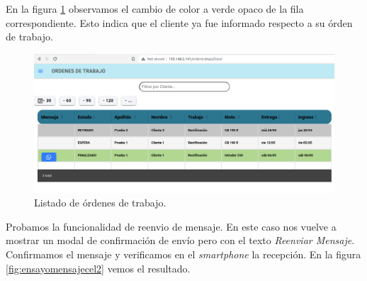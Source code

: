 En la figura \ref{fig:ensayomensajefinalizado} observamos el cambio de color a verde opaco de la fila correspondiente. Esto indica que el cliente ya fue informado respecto a su órden de trabajo.

\begin{figure}[H]
	\centering
	\includegraphics[width=\textwidth]{./Figures/ensayo-1/17.finalizado.png}
	\caption{Listado de órdenes de trabajo.}
	\label{fig:ensayomensajefinalizado}
\end{figure}

Probamos la funcionalidad de reenvio de mensaje. En este caso nos vuelve a mostrar un modal de confirmación de envío pero con el texto \textit{Reenviar Mensaje}. Confirmamos el mensaje y verificamos en el \textit{smartphone} la recepción. En la figura \ref{fig:ensayomensajecel2} vemos el resultado.

